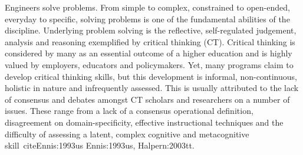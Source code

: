 Engineers solve problems.  From simple to complex, constrained to open-ended, everyday to specific, solving problems is one of the fundamental abilities of the discipline.  Underlying problem solving is the reflective, self-regulated judgement, analysis and reasoning exemplified by critical thinking (CT).  Critical thinking is considered by many as an essential outcome of a higher education and is highly valued by employers, educators and policymakers.  Yet, many  programs claim to develop critical thinking skills, but this development is informal, non-continuous, holistic in nature and infrequently assessed\cite{Paul:1997ti, Ahern:2012ey}.  This is usually attributed to the lack of consensus and debates amongst CT scholars and researchers on a number of issues.  These range from a lack of a consensus operational definition, disagreement on domain-specificity\cite{Ennis:1989bm, McPeck:1990is}, effective instructional techniques\cite{Tsui:2002cc} and the difficulty of assessing a latent, complex cognitive and metacognitive skill\ cite{Ennis:1993us}
{Ennis:1993us, Halpern:2003tt}.   

